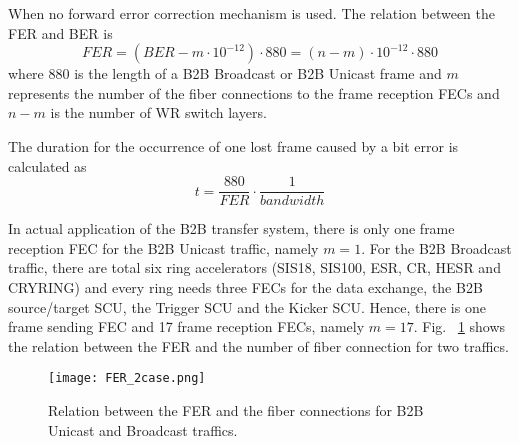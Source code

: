 When no forward error correction mechanism is used. The relation between the FER and BER is
\begin{equation}
\label{m-n}
	FER=(BER-m\cdot10^{-12})\cdot 880=(n-m)\cdot10^{-12}\cdot 880
\end{equation}
where 880 is the length of a B2B Broadcast or B2B Unicast frame and $m$ represents the number of the fiber connections to the frame reception FECs and $n-m$ is the number of WR switch layers.  

The duration for the occurrence of one lost frame caused by a bit error is calculated as 
\begin{equation}
\label{duration}
	t=\frac{880}{FER}\cdot \frac{1}{bandwidth}
\end{equation}
 
In actual application of the B2B transfer system, there is only one frame reception FEC for the B2B Unicast traffic, namely $m=1$. For the B2B Broadcast traffic, there are total six ring accelerators (SIS18, SIS100, ESR, CR, HESR and CRYRING) and every ring needs three FECs for the data exchange, the B2B source/target SCU, the Trigger SCU and the Kicker SCU. Hence, there is one frame sending FEC and 17 frame reception FECs, namely $m=17$. Fig. ~\ref{FER_2case} shows the relation between the FER and the number of fiber connection for two traffics.   
\begin{figure}[H]
   \centering   
   \texttt{[image: FER\_2case.png]}
   \caption{Relation between the FER and the fiber connections for B2B Unicast and Broadcast traffics.}
   \label{FER_2case}
\end{figure}


